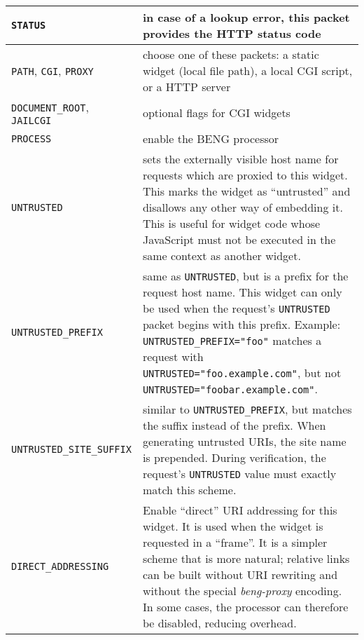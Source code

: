 \documentclass[a4paper,12pt]{article}
\begin{document}
\begin{longtable}{|l|p{8cm}|}
\hline
\verb|STATUS| & in case of a lookup error, this packet provides the
HTTP status code \\
\hline

\verb|PATH|, \verb|CGI|, \verb|PROXY| & choose one of these
packets: a static widget (local file path), a local CGI script, or a
HTTP server \\

\hline

\verb|DOCUMENT_ROOT|, \verb|JAILCGI| & optional flags for CGI
widgets \\

\hline
\verb|PROCESS| & enable the BENG processor \\

\hline

\verb|UNTRUSTED| & sets the externally visible host name for requests
which are proxied to this widget.  This marks the widget as
``untrusted'' and disallows any other way of embedding it.  This is
useful for widget code whose JavaScript must not be executed in the
same context as another widget. \\

\hline

\verb|UNTRUSTED_PREFIX| & same as \verb|UNTRUSTED|, but is a
prefix for the request host name.  This widget can only be used when
the request's \verb|UNTRUSTED| packet begins with this prefix.
Example: \verb|UNTRUSTED_PREFIX="foo"| matches a request with
\verb|UNTRUSTED="foo.example.com"|, but not
\verb|UNTRUSTED="foobar.example.com"|. \\

\hline

\verb|UNTRUSTED_SITE_SUFFIX| & similar to
\verb|UNTRUSTED_PREFIX|, but matches the suffix instead of the
prefix.  When generating untrusted URIs, the site name is prepended.
During verification, the request's \verb|UNTRUSTED| value must
exactly match this scheme. \\

\hline

\verb|DIRECT_ADDRESSING| & Enable ``direct'' URI addressing for this
widget.  It is used when the widget is requested in a ``frame''.  It
is a simpler scheme that is more natural; relative links can be built
without URI rewriting and without the special \emph{beng-proxy}
encoding.  In some cases, the processor can therefore be disabled,
reducing overhead. \\


\end{longtable}
\end{document}
